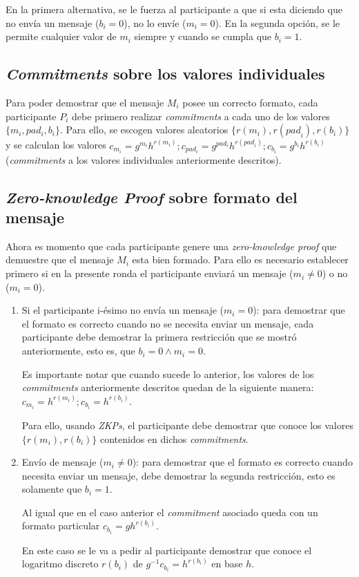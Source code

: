 En la primera alternativa, se le fuerza al participante a que si esta diciendo 
que no envía un mensaje ($b_i = 0$), no lo envíe ($m_i = 0$). En la segunda 
opción, se le permite cualquier valor de $m_i$ siempre y cuando se cumpla que 
$b_i = 1$.

\subsection{\emph{Commitments} sobre los valores individuales}

Para poder demostrar que el mensaje $M_i$ posee un correcto formato, cada 
participante $P_i$  debe primero realizar \emph{commitments} a cada uno de los 
valores $\{m_i, pad_i, b_i\}$. Para ello, se escogen valores aleatorios 
$\{r(m_i), r({pad}_i), r(b_i)\}$ y se calculan los valores 
$c_{m_i} = g^{m_i} h^{r(m_i)}; c_{pad_i} = g^{pad_i} h^{r({pad}_i)}; 
c_{b_i} = g^{b_i} h^{r(b_i)}$ (\emph{commitments} a los valores individuales 
anteriormente descritos).

\subsection{\emph{Zero-knowledge Proof} sobre formato del mensaje}

Ahora es momento que cada participante genere una \emph{zero-knowledge proof} 
que demuestre que el mensaje $M_i$ esta bien formado. Para ello es necesario 
establecer primero si en la presente ronda el participante enviará un mensaje 
($m_i \neq 0$) o no ($m_i = 0$).

\begin{enumerate}
    \item Si el participante i-ésimo no envía un mensaje ($m_i = 0$): para 
    demostrar que el formato es correcto cuando no se necesita enviar un 
    mensaje, cada participante debe demostrar la primera restricción que se 
    mostró anteriormente, esto es, que $b_i = 0 \land m_i = 0$.
    
    Es importante notar que cuando sucede lo anterior, los valores de los 
    \emph{commitments} anteriormente descritos quedan de la siguiente manera: 
    $c_{m_i} = h^{r(m_i)}; c_{b_i} = h^{r(b_i)}$.
    
    Para ello, usando \emph{ZKPs}, el participante debe demostrar que conoce 
    los valores $\{r(m_i), r(b_i)\}$ contenidos en dichos \emph{commitments}.
    
    \item Envío de mensaje ($m_i \neq 0$): para demostrar que el formato es 
    correcto cuando necesita enviar un mensaje, debe demostrar la segunda 
    restricción, esto es solamente que $b_i = 1$.
    
    Al igual que en el caso anterior el \emph{commitment} asociado queda con 
    un formato particular $c_{b_i} = g h^{r(b_i)}$.
    
    En este caso se le va a pedir al participante demostrar que conoce el 
    logaritmo discreto $r(b_i)$ de $g^{-1} c_{b_i} = h^{r(b_i)}$ en base $h$.
\end{enumerate}

